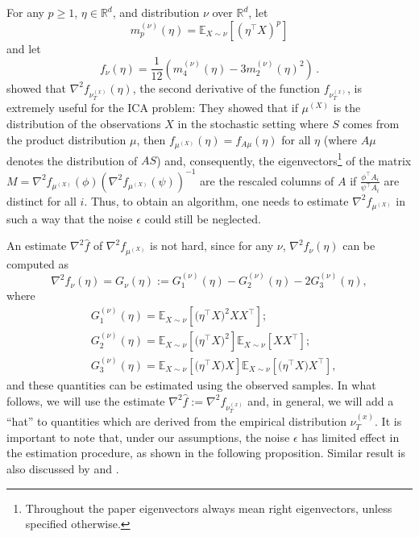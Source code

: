 \documentclass[twoside,11pt]{article}
\newcommand{\E}{\mathbb{E}}
\newcommand{\real}{\mathbb{R}}
\newcommand{\R}{\real}
\begin{document}
For any $p\ge 1$, $\eta\in \real^d$, and distribution $\nu$ over $\R^d$,
let 
\begin{equation}
\label{eq:momnent}
m_p^{(\nu)}(\eta) = \E_{X\sim \nu}[ (\eta^\top X)^p ]
\end{equation}
and let
\begin{equation}
\label{eq:funcf}
f_{\nu}(\eta) = \frac1{12} \left( m_4^{(\nu)}(\eta) - 3 m_2^{(\nu)}(\eta)^2 \right)\,.
\end{equation}
\citet{hsu2013learning} showed that $\nabla^2f_{\nu_T^{(x)}}(\eta)$, the second derivative of the function $f_{\nu_T^{(x)}}$, is extremely useful for the ICA problem:
They showed that if $\mu^{(X)}$ is the distribution of the observations $X$ in the stochastic setting where $S$ comes from the product distribution $\mu$, then
$f_{\mu^{(X)}}(\eta)=f_{A\mu}(\eta)$ for all $\eta$ (where $A\mu$ denotes the distribution of $AS$) and, consequently, the eigenvectors\footnote{Throughout the paper eigenvectors always mean right eigenvectors, unless specified otherwise.} of the matrix $M=\nabla^2f_{\mu^{(X)}}(\phi)(\nabla^2f_{\mu^{(X)}}(\psi))^{-1}$ are the rescaled columns of $A$ if $\frac{\phi^\top A_i}{\psi^\top A_i}$ are distinct for all $i$. 
Thus, to obtain an algorithm, one needs to estimate $\nabla^2 f_{\mu^{(X)}}$ in such a way that the noise $\epsilon$ could still be neglected.

An estimate $\nabla^2 \hat{f}$ of $\nabla^2f_{\mu^{(X)}}$ is not hard, since for any $\nu$,
$\nabla^2f_{\nu}(\eta)$  can be computed as
\begin{equation}
\label{eq:G}
\nabla^2 f_{\nu}(\eta) = G_{\nu}(\eta):= G_1^{(\nu)}(\eta) - G_2^{(\nu)}(\eta) -2G_3^{(\nu)}(\eta),
\end{equation}
where 
\begin{align*}
& G_1^{(\nu)}(\eta) =  \E_{X\sim \nu} [\big(\eta^{\top}X\big)^2XX^{\top}]; \\
& G_2^{(\nu)}(\eta) = \E_{X\sim \nu} [\big(\eta^{\top}X\big)^2] \E_{X\sim \nu} [XX^{\top}]; \\
& G_3^{(\nu)}(\eta) = \E_{X\sim \nu} [\big(\eta^{\top}X\big)X] \E_{X\sim \nu} [\big(\eta^{\top}X\big)X^{\top}],
\end{align*} 
and these quantities can be estimated using the observed samples. In what follows, we will use the estimate $\nabla^2 \hat{f}:=\nabla^2 f_{\nu_T^{(x)}}$ and, in general, we will add a ``hat'' to quantities which are derived from the empirical distribution $\nu_T^{(x)}$. 
It is important to note that, under our assumptions, the noise $\epsilon$ has limited effect in the estimation procedure, as shown in the following proposition. 
Similar result is also discussed by \citet{arora2012provable} and \citet{belkin2013blind}.
\end{document}
